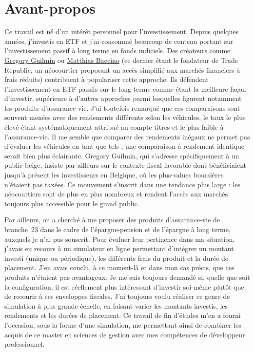 ﻿\documentclass[12pt, a4paper]{article}
\begin{document}
\newpage
\pagestyle{empty}

\section*{Avant-propos}

Ce travail est né d'un intérêt personnel pour l'investissement. Depuis quelques années,
j'investis en ETF et j'ai consommé beaucoup de contenu portant sur l'investissement
passif à long terme en fonds indiciels. Des créateurs comme
\href{https://www.youtube.com/@gregoryguilmin}{Gregory Guilmin} ou
\href{https://www.youtube.com/@matthiasbaccino}{Matthias Baccino} (ce dernier
étant le fondateur de Trade Republic, un néocourtier proposant un accès simplifié aux
marchés financiers à frais réduits) contribuent à populariser cette
approche. Ils défendent l'investissement en ETF passifs sur le long terme comme étant la
meilleure façon d'investir, supérieure à d'autres approches parmi lesquelles
figurent notamment les produits d'assurance-vie. J'ai toutefois remarqué que ces
comparaisons sont souvent menées avec des rendements différents selon les véhicules,
le taux le plus élevé étant systématiquement attribué au compte-titres et le plus
faible à l'assurance-vie. Il me semble que comparer des rendements inégaux ne permet
pas d'évaluer les véhicules en tant que tels ; une comparaison à rendement identique
serait bien plus éclairante. Gregory Guilmin, qui s'adresse
spécifiquement à un public belge, insiste par ailleurs sur le contexte fiscal
favorable dont bénéficiaient jusqu'à présent les investisseurs en Belgique, où les
plus-values boursières n'étaient pas taxées. Ce mouvement s'inscrit dans une
tendance plus large : les néocourtiers sont de plus en plus nombreux et rendent l'accès
aux marchés toujours plus accessible pour le grand public.

Par ailleurs, on a cherché à me proposer des produits d'assurance-vie de
branche~23 dans le cadre de l'épargne-pension et de l'épargne à long terme, auxquels
je n'ai pas souscrit. Pour évaluer leur pertinence dans ma situation, j'avais eu
recours à un simulateur en ligne permettant d'intégrer un montant investi (unique ou
périodique), les différents frais du produit et la durée de placement. J'en avais
conclu, à ce moment-là et dans mon cas précis, que ces produits n'étaient pas
avantageux.
Je me suis toujours demandé si, quelle que soit
la configuration, il est réellement plus intéressant d'investir soi-même plutôt que de
recourir à ces enveloppes fiscales. J'ai toujours voulu réaliser ce genre de simulation
à plus grande échelle, en faisant varier les montants investis, les rendements et les
durées de placement. Ce travail de fin d'études m'en a fourni l'occasion, sous la
forme d'une simulation, me permettant ainsi de combiner les
acquis de ce master en sciences de gestion avec mes compétences de développeur
professionnel.
\end{document}
